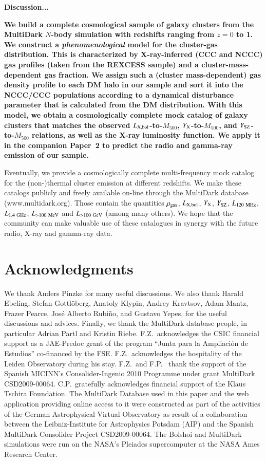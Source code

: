 \documentclass[useAMS,usenatbib]{mn2e}
\begin{document}
{\bf Discussion...}

{\bf We build a complete cosmological sample of galaxy clusters from the MultiDark 
$N$-body simulation with redshifts ranging from $z = 0$ to 1. We construct a 
\emph{phenomenological} model for the cluster-gas distribution. This is characterized 
by X-ray-inferred (CCC and NCCC) gas profiles (taken from the REXCESS sample) 
and a cluster-mass-dependent gas fraction. We assign such a (cluster mass-dependent) 
gas density profile to each DM halo in our sample and sort it into the NCCC/CCC populations 
according to a dynamical disturbance parameter that is calculated from the DM distribution.
With this model, we obtain a cosmologically complete mock catalog of galaxy
clusters that matches the observed $L_{{\mathrm{X, bol}}}$-to-$M_{500}$,
$Y_{{\mathrm{X}}}$-to-$M_{500}$, and $Y_{{\mathrm{SZ}}}$-to-$M_{500}$ relations, as well
as the X-ray luminosity function. We apply it in the companion Paper~2 to 
predict the radio and gamma-ray emission of our sample. 

Eventually, we provide a cosmologically complete multi-frequency mock catalog for the (non-)thermal 
cluster emission at different redshifts. We make these catalogs publicly and freely available 
on-line through the MultiDark database (www.multidark.org). Those contain the quantities
$\rho_{{\mathrm{gas}}}$, $L_{{\mathrm{X, bol}}}$, $Y_{{\mathrm{X}}}$, $Y_{{\mathrm{SZ}}}$, $L_{120~{\mathrm{MHz}}}$, 
$L_{1.4~{\mathrm{GHz}}}$, $L_{>100~{\mathrm{MeV}}}$ and $L_{>100~{\mathrm{GeV}}}$ (among many others). 
We hope that the community can make valuable use of these catalogues in synergy with the future 
radio, X-ray and gamma-ray data.}


\section*{Acknowledgments}
We thank Anders Pinzke for many useful discussions. We also thank Harald Ebeling, 
Stefan Gottl{\"o}berg, Anatoly Klypin, Andrey Kravtsov, Adam Mantz, Frazer Pearce, 
Jos\'e Alberto Rubi\~no, and Gustavo Yepes, for the useful discussions and advices. 
Finally, we thank the MultiDark database people, in particular Adrian Partl and Kristin Riebe. 
F.Z.{\ }acknowledges the CSIC financial support as a JAE-Predoc grant of the 
program ``Junta para la Ampliaci\'on de Estudios'' co-financed by the FSE. 
F.Z.{\ }acknowledges the hospitality of the Leiden Observatory during his stay.
F.Z.{\ }and F.P.{\ } thank the support of the Spanish MICINN's Consolider-Ingenio 2010 Programme under
grant MultiDark CSD2009-00064. C.P.{\ }gratefully acknowledges financial support
of the Klaus Tschira Foundation. The MultiDark Database used in this paper and
the web application providing online access to it were constructed as part of
the activities of the German Astrophysical Virtual Observatory as result of a
collaboration between the Leibniz-Institute for Astrophysics Potsdam (AIP) and
the Spanish MultiDark Consolider Project CSD2009-00064. The Bolshoi and
MultiDark simulations were run on the NASA's Pleiades supercomputer at the NASA
Ames Research Center.
\end{document}
